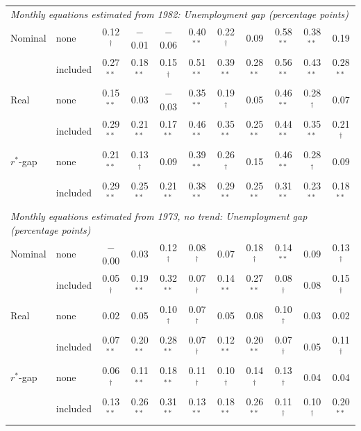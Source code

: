 \begin{tabular}{llccccccccc}
\midrule
\multicolumn{11}{l}{\textit{Monthly equations estimated from 1982: Unemployment gap (percentage points)}}\\
Nominal & none & 0.12$^{\dagger}$ & $-$0.01 & $-$0.06 & 0.40$^{**}$ & 0.22$^{\dagger}$ & 0.09 & 0.58$^{**}$ & 0.38$^{**}$ & 0.19 \\
 & included & 0.27$^{**}$ & 0.18$^{**}$ & 0.15$^{\dagger}$ & 0.51$^{**}$ & 0.39$^{**}$ & 0.28$^{**}$ & 0.56$^{**}$ & 0.43$^{**}$ & 0.28$^{**}$ \\
Real & none & 0.15$^{**}$ & 0.03 & $-$0.03 & 0.35$^{**}$ & 0.19$^{\dagger}$ & 0.05 & 0.46$^{**}$ & 0.28$^{\dagger}$ & 0.07 \\
 & included & 0.29$^{**}$ & 0.21$^{**}$ & 0.17$^{**}$ & 0.46$^{**}$ & 0.35$^{**}$ & 0.25$^{**}$ & 0.44$^{**}$ & 0.35$^{**}$ & 0.21$^{\dagger}$ \\
$r^*$-gap & none & 0.21$^{**}$ & 0.13$^{\dagger}$ & 0.09 & 0.39$^{**}$ & 0.26$^{\dagger}$ & 0.15 & 0.46$^{**}$ & 0.28$^{\dagger}$ & 0.09 \\
 & included & 0.29$^{**}$ & 0.25$^{**}$ & 0.21$^{**}$ & 0.38$^{**}$ & 0.29$^{**}$ & 0.25$^{**}$ & 0.31$^{**}$ & 0.23$^{**}$ & 0.18$^{**}$ \\
\midrule
\multicolumn{11}{l}{\textit{Monthly equations estimated from 1973, no trend: Unemployment gap (percentage points)}}\\
Nominal & none & $-$0.00 & 0.03 & 0.12$^{\dagger}$ & 0.08$^{\dagger}$ & 0.07 & 0.18$^{\dagger}$ & 0.14$^{**}$ & 0.09 & 0.13$^{\dagger}$ \\
 & included & 0.05$^{\dagger}$ & 0.19$^{**}$ & 0.32$^{**}$ & 0.07$^{\dagger}$ & 0.14$^{**}$ & 0.27$^{**}$ & 0.08$^{\dagger}$ & 0.08 & 0.15$^{\dagger}$ \\
Real & none & 0.02 & 0.05 & 0.10$^{\dagger}$ & 0.07$^{\dagger}$ & 0.05 & 0.08 & 0.10$^{\dagger}$ & 0.03 & 0.02 \\
 & included & 0.07$^{**}$ & 0.20$^{**}$ & 0.28$^{**}$ & 0.07$^{\dagger}$ & 0.12$^{**}$ & 0.20$^{**}$ & 0.07$^{\dagger}$ & 0.05 & 0.11$^{\dagger}$ \\
$r^*$-gap & none & 0.06$^{\dagger}$ & 0.11$^{**}$ & 0.18$^{**}$ & 0.11$^{\dagger}$ & 0.10$^{\dagger}$ & 0.14$^{\dagger}$ & 0.13$^{\dagger}$ & 0.04 & 0.04 \\
 & included & 0.13$^{**}$ & 0.26$^{**}$ & 0.31$^{**}$ & 0.13$^{**}$ & 0.18$^{**}$ & 0.26$^{**}$ & 0.11$^{\dagger}$ & 0.10$^{\dagger}$ & 0.20$^{**}$ \\
\bottomrule
\end{tabular}
